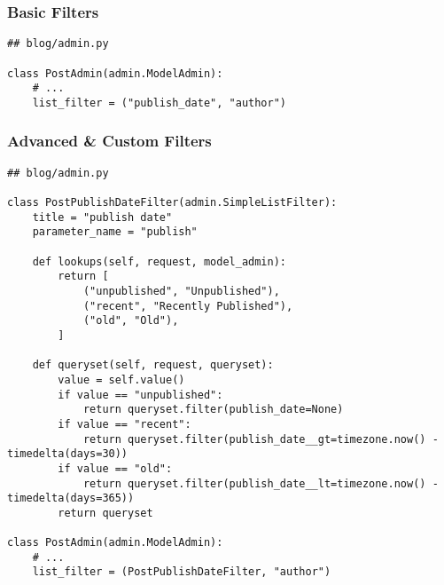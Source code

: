 \documentclass[aspectratio=169]{beamer}
\begin{document}
\begin{frame}[fragile]
\frametitle{Basic Filters}

{\tiny
\begin{verbatim}
## blog/admin.py

class PostAdmin(admin.ModelAdmin):
    # ...
    list_filter = ("publish_date", "author")
\end{verbatim}
}

\end{frame}

\begin{frame}
  \begin{figure}[p]
    \centering
  \end{figure}
\end{frame}


\begin{frame}[fragile]
\frametitle{Advanced \& Custom Filters}

{\tiny
\begin{verbatim}
## blog/admin.py

class PostPublishDateFilter(admin.SimpleListFilter):
    title = "publish date"
    parameter_name = "publish"

    def lookups(self, request, model_admin):
        return [
            ("unpublished", "Unpublished"),
            ("recent", "Recently Published"),
            ("old", "Old"),
        ]

    def queryset(self, request, queryset):
        value = self.value()
        if value == "unpublished":
            return queryset.filter(publish_date=None)
        if value == "recent":
            return queryset.filter(publish_date__gt=timezone.now() - timedelta(days=30))
        if value == "old":
            return queryset.filter(publish_date__lt=timezone.now() - timedelta(days=365))
        return queryset

class PostAdmin(admin.ModelAdmin):
    # ...
    list_filter = (PostPublishDateFilter, "author")
\end{verbatim}
}
\end{frame}

\begin{frame}
  \begin{figure}[p]
    \centering
  \end{figure}
\end{frame}
\end{document}
